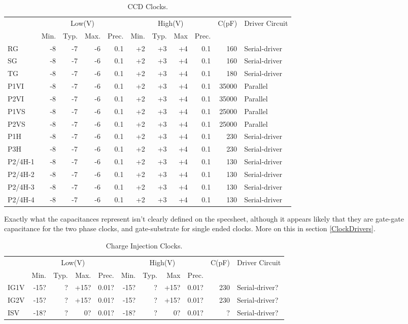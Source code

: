 \documentclass[a4paper,12pt]{article}
\begin{document}
\begin{table}[h]
\centering
\begin{tabular}{|l|rrrr|rrrr|r|l|}
\hline
&\multicolumn{4}{c|}{Low(V)}&\multicolumn{4}{c|}{High(V)}& C(pF)& Driver Circuit \\ 
&Min.&Typ.&Max.&Prec.&Min.&Typ.&Max&Prec.&& \\
\hline
RG & -8 & -7 & -6 & 0.1 & +2 & +3 & +4 & 0.1 & 160 & Serial-driver \\
SG & -8 & -7 & -6 & 0.1 & +2 & +3 & +4 & 0.1 & 160 & Serial-driver \\
TG & -8 & -7 & -6 & 0.1 & +2 & +3 & +4 & 0.1 & 180 & Serial-driver \\
P1VI & -8 & -7 & -6 & 0.1 & +2 & +3 & +4 & 0.1 & 35000 & Parallel \\
P2VI & -8 & -7 & -6 & 0.1 & +2 & +3 & +4 & 0.1 & 35000 & Parallel \\
P1VS & -8 & -7 & -6 & 0.1 & +2 & +3 & +4 & 0.1 & 25000 & Parallel \\
P2VS & -8 & -7 & -6 & 0.1 & +2 & +3 & +4 & 0.1 & 25000 & Parallel \\
P1H & -8 & -7 & -6 & 0.1 & +2 & +3 & +4 & 0.1 & 230 & Serial-driver \\
P3H & -8 & -7 & -6 & 0.1 & +2 & +3 & +4 & 0.1 & 230 & Serial-driver \\
P2/4H-1 & -8 & -7 & -6 & 0.1 & +2 & +3 & +4 & 0.1 & 130 & Serial-driver \\
P2/4H-2 & -8 & -7 & -6 & 0.1 & +2 & +3 & +4 & 0.1 & 130 & Serial-driver \\
P2/4H-3 & -8 & -7 & -6 & 0.1 & +2 & +3 & +4 & 0.1 & 130 & Serial-driver \\
P2/4H-4 & -8 & -7 & -6 & 0.1 & +2 & +3 & +4 & 0.1 & 130 & Serial-driver \\
\hline
\end{tabular}
 \caption{CCD Clocks.}
 \label{Clocks}
\end{table}

Exactly what the capacitances represent isn't clearly defined on the specsheet, although it appears likely that they are gate-gate capacitance for the two phase clocks, and gate-substrate for single ended clocks. More on this in section \ref{ClockDrivers}.

\begin{table}[h]
\centering
\begin{tabular}{|l|rrrr|rrrr|r|l|}
\hline
&\multicolumn{4}{c|}{Low(V)}&\multicolumn{4}{c|}{High(V)}& C(pF)& Driver Circuit \\ 
&Min.&Typ.&Max.&Prec.&Min.&Typ.&Max&Prec.&& \\
\hline
IG1V & -15? & ? & +15? & 0.01? & -15? & ? & +15? & 0.01? & 230 & Serial-driver? \\
IG2V & -15? & ? & +15? & 0.01? & -15? & ? & +15? & 0.01? & 230 & Serial-driver? \\
ISV & -18? & ? & 0? & 0.01? & -18? & ? & 0? & 0.01? & ? & Serial-driver? \\
\hline
\end{tabular}
 \caption{Charge Injection Clocks.}
 \label{CIClocks}
\end{table}
\end{document}
